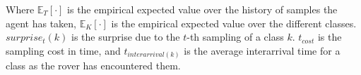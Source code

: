 Where $\mathbb{E}_{T}\left[\cdot\right]$ is the empirical expected value over the history of samples the agent has taken, $\mathbb{E}_{K}\left[\cdot\right]$ is the empirical expected value over the different classes. $surprise_{t}(k)$ is the surprise due to the $t$-th sampling of a class $k$.  $t_{cost}$ is the sampling cost in time, and $t_{interarrival(k)}$ is the average interarrival time for a class as the rover has encountered them.



% 
% 


